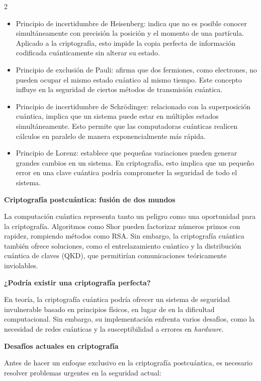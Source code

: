 \documentclass[12pt,spanish,Letterpaper,openany]{book}
\begin{document}
\begin {multicols}{2}
\begin{itemize}
\item
  Principio de incertidumbre de Heisenberg: indica que no es posible conocer simultáneamente con precisión la posición y el momento de una partícula. Aplicado a la criptografía, esto impide la copia perfecta de información codificada cuánticamente sin alterar su estado.
\item
  Principio de exclusión de Pauli: afirma que dos fermiones, como electrones, no pueden ocupar el mismo estado cuántico al mismo tiempo. Este concepto influye en la seguridad de ciertos métodos de transmisión cuántica.
\item
  Principio de incertidumbre de Schrödinger: relacionado con la superposición cuántica, implica que un sistema puede estar en múltiples estados simultáneamente. Esto permite que las computadoras cuánticas realicen cálculos en paralelo de manera exponencialmente más rápida.
\item
  Principio de Lorenz: establece que pequeñas variaciones pueden generar grandes cambios en un sistema. En criptografía, esto implica que un pequeño error en una clave cuántica podría comprometer la seguridad de todo el sistema.
\end{itemize}

\textbf{Criptografía postcuántica: fusión de dos mundos}

La computación cuántica representa tanto un peligro como una oportunidad para la criptografía. Algoritmos como Shor pueden factorizar números primos con rapidez, rompiendo métodos como RSA. Sin embargo, la criptografía cuántica también ofrece soluciones, como el entrelazamiento cuántico y la distribución cuántica de claves (QKD), que permitirían comunicaciones teóricamente inviolables.

\textbf{¿Podría existir una criptografía perfecta?}

En teoría, la criptografía cuántica podría ofrecer un sistema de seguridad invulnerable basado en principios físicos, en lugar de en la dificultad computacional. Sin embargo, su implementación enfrenta varios desafíos, como la necesidad de redes cuánticas y la susceptibilidad a errores en \emph{hardware}.

\textbf{Desafíos actuales en criptografía}

Antes de hacer un enfoque exclusivo en la criptografía postcuántica, es necesario resolver problemas urgentes en la seguridad actual:

\bigskip
\bigskip


\end{multicols}
\end{document}
